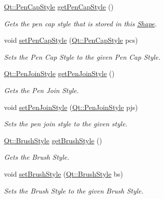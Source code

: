 \begin{DoxyCompactItemize}
\hyperlink{shape__input__file__specs_8txt_a622efdcfef6789d4367974d2fe79019e}{Qt\+::\+Pen\+Cap\+Style} \hyperlink{classPolygon_a6a87aa5a647a925d520fb3462e3450dc}{get\+Pen\+Cap\+Style} ()
\begin{DoxyCompactList}\small\item\em Gets the pen cap style that is stored in this \hyperlink{classShape}{Shape}. \end{DoxyCompactList}\item 
void \hyperlink{classPolygon_a9bffdd7d7b4f98fdb14fcba435ff4857}{set\+Pen\+Cap\+Style} (\hyperlink{shape__input__file__specs_8txt_a622efdcfef6789d4367974d2fe79019e}{Qt\+::\+Pen\+Cap\+Style} pcs)
\begin{DoxyCompactList}\small\item\em Sets the Pen Cap Style to the given Pen Cap Style. \end{DoxyCompactList}\item 
\hyperlink{shape__input__file__specs_8txt_a007db2043c6063881de2043c05c9c4a9}{Qt\+::\+Pen\+Join\+Style} \hyperlink{classPolygon_a1472bbc12cc60b90b666d509ffefaf47}{get\+Pen\+Join\+Style} ()
\begin{DoxyCompactList}\small\item\em Gets the Pen Join Style. \end{DoxyCompactList}\item 
void \hyperlink{classPolygon_a1dbd55cf600447893405712943f01a95}{set\+Pen\+Join\+Style} (\hyperlink{shape__input__file__specs_8txt_a007db2043c6063881de2043c05c9c4a9}{Qt\+::\+Pen\+Join\+Style} pjs)
\begin{DoxyCompactList}\small\item\em Sets the pen join style to the given style. \end{DoxyCompactList}\item 
\hyperlink{shape__input__file__specs_8txt_ad07f6fe6c28dcb0b3bdc324a72d0051f}{Qt\+::\+Brush\+Style} \hyperlink{classPolygon_a8a827f50a6b4f1a3233cc343b26e5bf4}{get\+Brush\+Style} ()
\begin{DoxyCompactList}\small\item\em Gets the Brush Style. \end{DoxyCompactList}\item 
void \hyperlink{classPolygon_a8c373e3f2f22b4e25adc081dfba4c007}{set\+Brush\+Style} (\hyperlink{shape__input__file__specs_8txt_ad07f6fe6c28dcb0b3bdc324a72d0051f}{Qt\+::\+Brush\+Style} bs)
\begin{DoxyCompactList}\small\item\em Sets the Brush Style to the given Brush Style. \end{DoxyCompactList}\item 

\end{DoxyCompactItemize}

